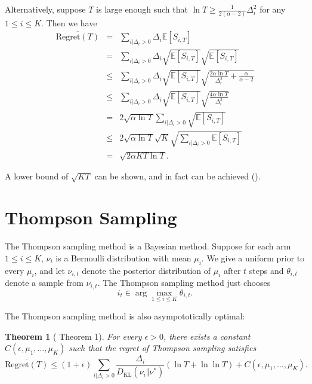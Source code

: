 \documentclass[openany]{book}
\newtheorem{theorem}{Theorem}[chapter]
\theoremstyle{definition}
\theoremstyle{remark}
\begin{document}
Alternatively, suppose $T$ is large enough such that $\ln T\ge \frac{1}{2(\alpha-2)}\Delta_i^2$ for any $1\le i\le K$. Then we have
\begin{equation}
    \begin{array}{rcl}
        \overline{\mathrm{Regret}(T)} & = & \displaystyle \sum_{i|\Delta_i>0}^{}\Delta_i \mathbb{E}[S_{i,T}] \\
         & = & \displaystyle \sum_{i|\Delta_i>0}^{}\Delta_i\sqrt{\mathbb{E}[S_{i,T}]}\sqrt{\mathbb{E}[S_{i,T}]} \\
         & \le & \displaystyle \sum_{i|\Delta_i>0}^{}\Delta_i\sqrt{\mathbb{E}[S_{i,T}]}\sqrt{\frac{2\alpha\ln T}{\Delta_i^2}+\frac{\alpha}{\alpha-2}} \\
         & \le & \displaystyle \sum_{i|\Delta_i>0}^{}\Delta_i\sqrt{\mathbb{E}[S_{i,T}]}\sqrt{\frac{4\alpha\ln T}{\Delta_i^2}} \\
         & = & \displaystyle2\sqrt{\alpha\ln T}\sum_{i|\Delta_i>0}^{}\sqrt{\mathbb{E}[S_{i,T}]} \\
         & \le & \displaystyle2\sqrt{\alpha\ln T}\sqrt{K}\sqrt{\sum_{i|\Delta_i>0}^{}\mathbb{E}[S_{i,T}]} \\
         & = & \sqrt{2\alpha KT\ln T}.
    \end{array}
\end{equation}

A lower bound of $\sqrt{KT}$ can be shown, and in fact can be achieved (\cite{AB09}).

\section{Thompson Sampling}
The Thompson sampling method is a Bayesian method. Suppose for each arm $1\le i\le K$, $\nu_i$ is a Bernoulli distribution with mean $\mu_i$. We give a uniform prior to every $\mu_i$, and let $\nu_{i,t}$ denote the posterior distribution of $\mu_i$ after $t$ steps and $\theta_{i,t}$ denote a sample from $\nu_{i,t}$. The Thompson sampling method just chooses
\begin{equation}
    i_t\in\arg\max_{1\le i\le K}\theta_{i,t}.
\end{equation}

The Thompson sampling method is also asympototically optimal:
\begin{theorem}[\cite{KKM12} Theorem 1]
    For every $\epsilon>0$, there exists a constant $C(\epsilon,\mu_1,\ldots,\mu_K)$ such that the regret of Thompson sampling satisfies
    \begin{equation}\label{ThompsonBound}
        \overline{\mathrm{Regret}(T)}\le(1+\epsilon)\sum_{i|\Delta_i>0}^{}\frac{\Delta_i}{D_{\mathrm{KL}}(\nu_i\Vert\nu^*)}(\ln T+\ln\ln T)+C(\epsilon,\mu_1,\ldots,\mu_K).
    \end{equation}
\end{theorem}
\end{document}
